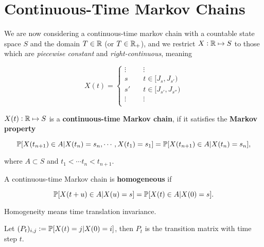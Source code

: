 \section{Continuous-Time Markov Chains}

We are now considering a continuous-time markov chain with a countable state space $S$ and the domain $T \in \mathbb{R}$ (or $T \in \mathbb{R}_+$), and we restrict $X: \mathbb{R} \mapsto S$ to those which are \textit{piecewise constant} and \textit{right-continuous}, meaning

\begin{equation*}
    X(t) = 
    \begin{cases}
        \vdots &  \vdots \\ 
        s \quad & t \in [J_s, J_{s'}) \\ 
        s' \quad & t \in [J_{s'}, J_{s''}) \\ 
        \vdots & \vdots \\ 
    \end{cases}
\end{equation*}

\begin{definition}
    $X(t): \mathbb{R} \mapsto S$ is a \textbf{continuous-time Markov chain}, if it satisfies the \textbf{Markov property}

    \begin{equation*}
        \mathbb{P}[X(t_{n+1}) \in A | X(t_n) = s_n, \cdots, X(t_1) =  s_1] = \mathbb{P}[X(t_{n+1}) \in A | X(t_n) = s_n],
    \end{equation*}

    where $A \subset S$ and $t_1 < \cdots t_{n} < t_{n+1}$.
\end{definition}

\begin{definition}[Homogeneity]
    A continuous-time Markov chain is \textbf{homogeneous} if 

    \begin{equation*}
        \mathbb{P} [X(t+u) \in A | X(u) = s] = \mathbb{P} [X(t) \in A | X(0) = s].
    \end{equation*}
\end{definition}

\begin{remark}
    Homogeneity means time translation invariance.
\end{remark}


\begin{definition}
    Let $(P_t)_{i,j} := \mathbb{P} [X(t) = j | X(0) = i]$, then $P_t$ is the transition matrix with time step $t$.
\end{definition}

